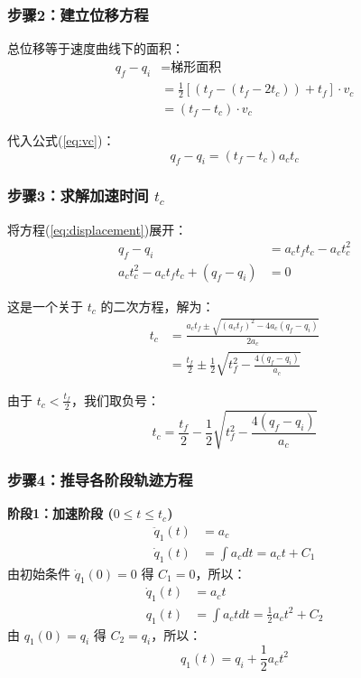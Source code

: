 \documentclass[12pt,a4paper]{article}
\begin{document}
\subsubsection{步骤2：建立位移方程}

总位移等于速度曲线下的面积：
\begin{align*}
    q_f - q_i &= \text{梯形面积} \\
    &= \frac{1}{2}[(t_f - (t_f - 2t_c)) + t_f] \cdot v_c \\
    &= (t_f - t_c) \cdot v_c
\end{align*}

代入公式(\ref{eq:vc})：
\begin{equation}
    q_f - q_i = (t_f - t_c) a_c t_c \label{eq:displacement}
\end{equation}

\subsubsection{步骤3：求解加速时间 $t_c$}

将方程(\ref{eq:displacement})展开：
\begin{align*}
    q_f - q_i &= a_c t_f t_c - a_c t_c^2 \\
    a_c t_c^2 - a_c t_f t_c + (q_f - q_i) &= 0
\end{align*}

这是一个关于 $t_c$ 的二次方程，解为：
\begin{align*}
    t_c &= \frac{a_c t_f \pm \sqrt{(a_c t_f)^2 - 4a_c(q_f - q_i)}}{2a_c} \\
    &= \frac{t_f}{2} \pm \frac{1}{2} \sqrt{t_f^2 - \frac{4(q_f - q_i)}{a_c}}
\end{align*}

由于 $t_c < \frac{t_f}{2}$，我们取负号：
\begin{equation}
\boxed{
t_c = \frac{t_f}{2} - \frac{1}{2} \sqrt{t_f^2 - \frac{4(q_f - q_i)}{a_c}}
}
\label{eq:tc_final}
\end{equation}

\subsubsection{步骤4：推导各阶段轨迹方程}

\textbf{阶段1：加速阶段 ($0 \leq t \leq t_c$)}
\begin{align*}
    \ddot{q}_1(t) &= a_c \\
    \dot{q}_1(t) &= \int a_c dt = a_c t + C_1
\end{align*}
由初始条件 $\dot{q}_1(0) = 0$ 得 $C_1 = 0$，所以：
\begin{align*}
    \dot{q}_1(t) &= a_c t \\
    q_1(t) &= \int a_c t dt = \frac{1}{2} a_c t^2 + C_2
\end{align*}
由 $q_1(0) = q_i$ 得 $C_2 = q_i$，所以：
\begin{equation}
\boxed{
q_1(t) = q_i + \frac{1}{2} a_c t^2
}
\label{eq:phase1}
\end{equation}
\end{document}
